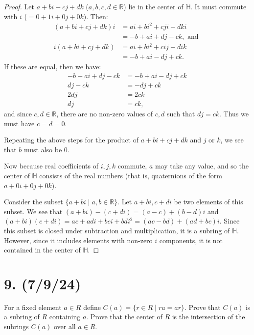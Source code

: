 \documentclass{article}
\begin{document}
\begin{proof}
    Let $a + bi + cj + dk$ ($a, b, c, d \in \mathbb{R}$) lie in the center of $\mathbb{H}$. It must commute with $i$ ($= 0 + 1i + 0j + 0k$). Then:
    \begin{align*}
        (a + bi + cj + dk)i &= ai + bi^2 + cji + dki \\
        &= -b + ai + dj - ck, \text{ and } \\
        i(a + bi + cj + dk) &= ai + bi^2 + cij + dik \\
        &= -b + ai - dj + ck.
    \end{align*}
    If these are equal, then we have:
    \begin{align*}
        -b + ai + dj - ck &= -b + ai - dj + ck \\
        dj - ck &= -dj + ck \\ 
        2dj &= 2ck \\
        dj &= ck,
    \end{align*}
    and since $c, d \in \mathbb{R}$, there are no non-zero values of $c, d$ such that $dj = ck$. Thus we must have $c = d = 0$.

    Repeating the above steps for the product of $a + bi + cj + dk$ and $j$ or $k$, we see that $b$ must also be 0.

    Now because real coefficients of $i, j, k$ commute, $a$ may take any value, and so the center of $\mathbb{H}$ consists of the real numbers (that is, quaternions of the form $a + 0i + 0j + 0k$).

    Consider the subset $\{ a + bi \mid a, b \in \mathbb{R} \}$. Let $a + bi, c + di$ be two elements of this subset. We see that $(a + bi) - (c + di) = (a - c) + (b - d)i$ and $(a + bi)(c + di) = ac + adi + bci + bdi^2 = (ac - bd) + (ad + bc)i$. Since this subset is closed under subtraction and multiplication, it is a subring of $\mathbb{H}$. However, since it includes elements with non-zero $i$ components, it is not contained in the center of $\mathbb{H}$.
\end{proof}

\section*{9. (7/9/24)}

For a fixed element $a \in R$ define $C(a) = \{ r \in R \mid ra = ar \}$. Prove that $C(a)$ is a subring of $R$ containing $a$. Prove that the center of $R$ is the intersection of the subrings $C(a)$ over all $a \in R$.
\end{document}
